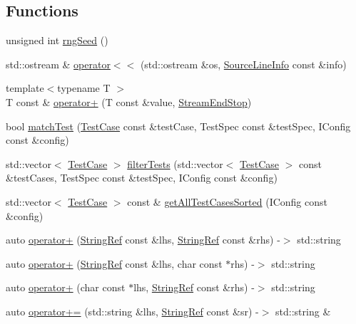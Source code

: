 \subsection*{Functions}
\begin{DoxyCompactItemize}
\item 
unsigned int \hyperlink{namespace_catch_acf5ea05e942d2d7fe79111e12754ed76}{rng\-Seed} ()
\item 
std\-::ostream \& \hyperlink{namespace_catch_a6ec18b5054d7fdfdde861c580b082995}{operator$<$$<$} (std\-::ostream \&os, \hyperlink{struct_catch_1_1_source_line_info}{Source\-Line\-Info} const \&info)
\item 
{\footnotesize template$<$typename T $>$ }\\T const \& \hyperlink{namespace_catch_a5e95b3c47a7618db3649dc39b0bb9004}{operator+} (T const \&value, \hyperlink{struct_catch_1_1_stream_end_stop}{Stream\-End\-Stop})
\item 
bool \hyperlink{namespace_catch_aadef80fbc6bc84589777a462770cef49}{match\-Test} (\hyperlink{class_catch_1_1_test_case}{Test\-Case} const \&test\-Case, Test\-Spec const \&test\-Spec, I\-Config const \&config)
\item 
std\-::vector$<$ \hyperlink{class_catch_1_1_test_case}{Test\-Case} $>$ \hyperlink{namespace_catch_ab5da9aa67c42a3f626aea07d0b556829}{filter\-Tests} (std\-::vector$<$ \hyperlink{class_catch_1_1_test_case}{Test\-Case} $>$ const \&test\-Cases, Test\-Spec const \&test\-Spec, I\-Config const \&config)
\item 
std\-::vector$<$ \hyperlink{class_catch_1_1_test_case}{Test\-Case} $>$ const \& \hyperlink{namespace_catch_a1c9b1a23bc947ea70ddaabf067276cf2}{get\-All\-Test\-Cases\-Sorted} (I\-Config const \&config)
\item 
auto \hyperlink{namespace_catch_a3a766cb0b8c792c9151baaaf1e8003eb}{operator+} (\hyperlink{class_catch_1_1_string_ref}{String\-Ref} const \&lhs, \hyperlink{class_catch_1_1_string_ref}{String\-Ref} const \&rhs) -\/$>$ std\-::string
\item 
auto \hyperlink{namespace_catch_ab7bdb68d0e4329df79e293f9207b55e9}{operator+} (\hyperlink{class_catch_1_1_string_ref}{String\-Ref} const \&lhs, char const $\ast$rhs) -\/$>$ std\-::string
\item 
auto \hyperlink{namespace_catch_a764a678121fa11c590a53618baa47680}{operator+} (char const $\ast$lhs, \hyperlink{class_catch_1_1_string_ref}{String\-Ref} const \&rhs) -\/$>$ std\-::string
\item 
auto \hyperlink{namespace_catch_a61711bc909f8dc76d8b3deccc1440f46}{operator+=} (std\-::string \&lhs, \hyperlink{class_catch_1_1_string_ref}{String\-Ref} const \&sr) -\/$>$ std\-::string \&

\end{DoxyCompactItemize}
